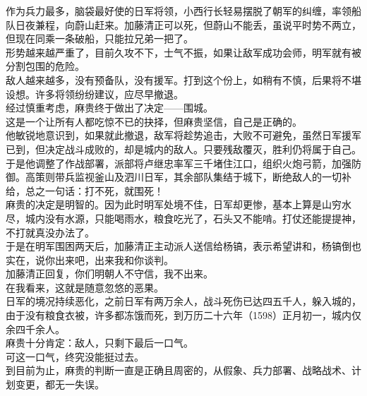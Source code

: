 \begin{multicols}{\theparacolNo}
作为兵力最多，脑袋最好使的日军将领，小西行长轻易摆脱了朝军的纠缠，率领船队日夜兼程，向蔚山赶来。加藤清正可以死，但蔚山不能丢，虽说平时势不两立，但现在同乘一条破船，只能拉兄弟一把了。\\

形势越来越严重了，目前久攻不下，士气不振，如果让敌军成功会师，明军就有被分割包围的危险。\\

敌人越来越多，没有预备队，没有援军。打到这个份上，如稍有不慎，后果将不堪设想。许多将领纷纷建议，应尽早撤退。\\

经过慎重考虑，麻贵终于做出了决定——围城。\\

这是一个让所有人都吃惊不已的抉择，但麻贵坚信，自己是正确的。\\

他敏锐地意识到，如果就此撤退，敌军将趁势追击，大败不可避免，虽然日军援军已到，但决定战斗成败的，却是城内的敌人。只要残敌覆灭，胜利仍将属于自己。\\

于是他调整了作战部署，派部将卢继忠率军三千堵住江口，组织火炮弓箭，加强防御。高策则带兵监视釜山及泗川日军，其余部队集结于城下，断绝敌人的一切补给，总之一句话：打不死，就围死！\\

麻贵的决定是明智的。因为此时明军处境不佳，日军却更惨，基本上算是山穷水尽，城内没有水源，只能喝雨水，粮食吃光了，石头又不能啃。打仗还能提提神，不打就真没办法了。\\

于是在明军围困两天后，加藤清正主动派人送信给杨镐，表示希望讲和，杨镐倒也实在，说你出来吧，出来我和你谈判。\\

加藤清正回复，你们明朝人不守信，我不出来。\\

在我看来，这就是随意忽悠的恶果。\\

日军的境况持续恶化，之前日军有两万余人，战斗死伤已达四五千人，躲入城的，由于没有粮食衣被，许多都冻饿而死，到万历二十六年（1598）正月初一，城内仅余四千余人。\\

麻贵十分肯定：敌人，只剩下最后一口气。\\

可这一口气，终究没能挺过去。\\

到目前为止，麻贵的判断一直是正确且周密的，从假象、兵力部署、战略战术、计划变更，都无一失误。\\


\end{multicols}
